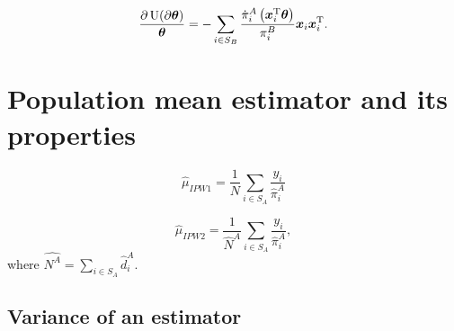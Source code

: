 \documentclass[
  letterpaper,
  DIV=11,
  numbers=noendperiod]{scrreprt}
\begin{document}
\[
    \frac{\partial \operatorname{U}(\partial \boldsymbol{\theta})}{\boldsymbol{\theta}} = - \sum_{i \in S_B} \frac{\dot{\pi}_i^A\left(\boldsymbol{x}_i^{\mathrm{T}} \boldsymbol{\theta} \right)}{\pi_i^B} \boldsymbol{x}_i \boldsymbol{x}_i^{\mathrm{T}}.
\]

\hypertarget{population-mean-estimator-and-its-properties}{%
\section{Population mean estimator and its
properties}\label{population-mean-estimator-and-its-properties}}

\[
\begin{equation*}
    \hat{\mu}_{IPW1} = \frac{1}{N} \sum_{i \in S_A} \frac{y_i}{\hat{\pi}_i^{A}}
\end{equation*}
\]

\[
\begin{equation*}
    \hat{\mu}_{IPW2} = \frac{1}{\hat{N}^{A}} \sum_{i \in S_A} \frac{y_i}{\hat{\pi}_i^{A}},
\end{equation*}
\] where \(\hat{N^A} = \sum_{i \in S_A} \hat{d}_i^A\).

\hypertarget{variance-of-an-estimator}{%
\subsection{Variance of an estimator}\label{variance-of-an-estimator}}
\end{document}
